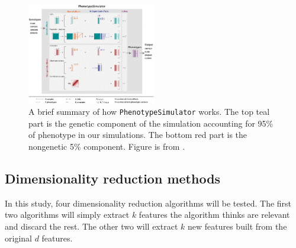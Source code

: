 \documentclass{article}
\begin{document}
\begin{figure}
    \centering
    \includegraphics[width=0.5\textwidth]{pheno.png}
    \caption{A brief summary of how \texttt{PhenotypeSimulator} works. The top teal part is the genetic component of the simulation accounting for 95\% of phenotype in our simulations. The bottom red part is the nongenetic 5\% component. Figure is from \cite{PS}.}
    \label{fig:phenotypesimulator}
\end{figure}

\subsection{Dimensionality reduction methods}
In this study, four dimensionality reduction algorithms will be tested. The first two algorithms will simply extract $k$ features the algorithm thinks are relevant and discard the rest. The other two will extract $k$ new features built from the original $d$ features. 
\end{document}
